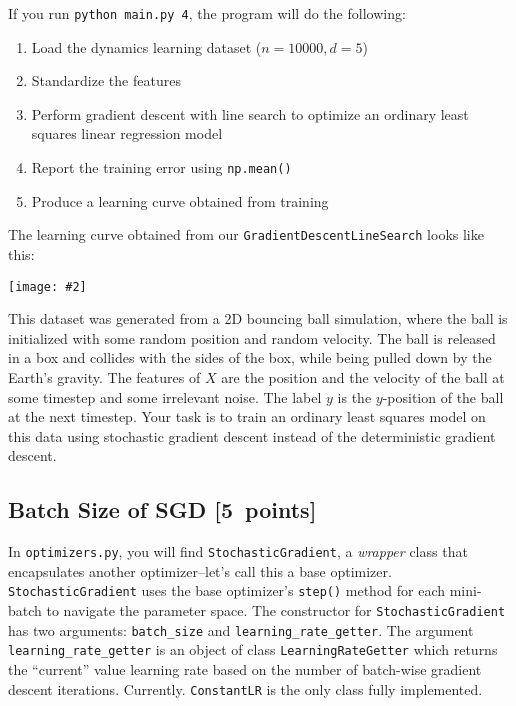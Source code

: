 \documentclass{article}
\newcommand\pts[1]{\textcolor{pointscolour}{[#1~points]}}
\newcommand{\centerfig}[2]{\begin{center}\texttt{[image: \#2]}\end{center}}
\begin{document}
If you run \verb|python main.py 4|, the program will do the following:
\begin{enumerate}
	\item Load the dynamics learning dataset ($n = 10000, d = 5$)
	\item Standardize the features
	\item Perform gradient descent with line search to optimize an ordinary least squares linear regression model
	\item Report the training error using \texttt{np.mean()}
	\item Produce a learning curve obtained from training
\end{enumerate}

The learning curve obtained from our \texttt{GradientDescentLineSearch} looks like this:
\centerfig{.6}{./figs/gd_line_search_curve.png}

This dataset was generated from a 2D bouncing ball simulation, where the ball is initialized with some random position and random velocity. The ball is released in a box and collides with the sides of the box, while being pulled down by the Earth's gravity. The features of $X$ are the position and the velocity of the ball at some timestep and some irrelevant noise. The label $y$ is the $y$-position of the ball at the next timestep. Your task is to train an ordinary least squares model on this data using stochastic gradient descent instead of the deterministic gradient descent.

\subsection{Batch Size of SGD \pts{5}}

In \texttt{optimizers.py}, you will find \texttt{StochasticGradient}, a \textit{wrapper} class that encapsulates another optimizer--let's call this a base optimizer.
\texttt{StochasticGradient} uses the base optimizer's \texttt{step()} method for each mini-batch to navigate the parameter space.
The constructor for \texttt{StochasticGradient} has two arguments: \texttt{batch\_size} and \texttt{learning\_rate\_getter}. The argument \texttt{learning\_rate\_getter} is an object of class \texttt{LearningRateGetter} which returns the ``current'' value learning rate based on the number of batch-wise gradient descent iterations. Currently. \texttt{ConstantLR} is the only class fully implemented.
\end{document}
